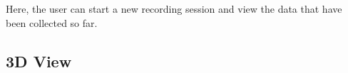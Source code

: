 \begin{minipage}{0.45\textwidth}
Here, the user can start a new recording session and view the data that have been collected so far.
\end{minipage} \hfill
\begin{minipage}{0.5\textwidth}
\end{minipage}


\subsection{3D View}

